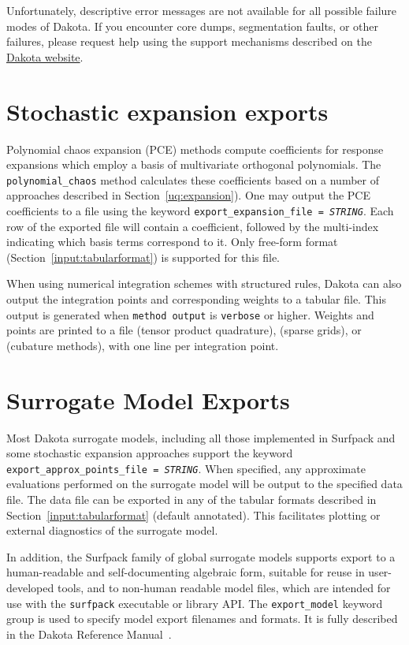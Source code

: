 Unfortunately, descriptive error messages are not available for all
possible failure modes of Dakota. If you encounter core dumps,
segmentation faults, or other failures, please request help using the
support mechanisms described on the
\href{http://dakota.sandia.gov/}{Dakota website}.


\section{Stochastic expansion exports}\label{sec:output:pce}

Polynomial chaos expansion (PCE) methods compute coefficients for
response expansions which employ a basis of multivariate orthogonal
polynomials.  The \texttt{polynomial\_chaos} method calculates these
coefficients based on a number of approaches described in
Section~\ref{uq:expansion}).  One may output the PCE coefficients to a
file using the keyword \texttt{export\_expansion\_file =
  \emph{STRING}}.  Each row of the exported file will contain a
coefficient, followed by the multi-index indicating which basis terms
correspond to it.  Only free-form format
(Section~\ref{input:tabularformat}) is supported for this file.

When using numerical integration schemes with structured rules, Dakota
can also output the integration points and corresponding weights to a
tabular file.  This output is generated when \texttt{method output} is
\texttt{verbose} or higher.  Weights and points are printed to a file
 (tensor product quadrature),
 (sparse grids), or
 (cubature methods), with one
line per integration point.

\section{Surrogate Model Exports}

Most Dakota surrogate models, including all those implemented in
Surfpack and some stochastic expansion approaches support the keyword
\texttt{export\_approx\_points\_file = \emph{STRING}}.  When specified, any
approximate evaluations performed on the surrogate model will be
output to the specified data file.  The data file can be exported in
any of the tabular formats described in
Section~\ref{input:tabularformat} (default annotated).  This
facilitates plotting or external diagnostics of the surrogate model.

In addition, the Surfpack family of global surrogate models supports
export to a human-readable and self-documenting algebraic form, suitable for 
reuse in user-developed tools, and to non-human readable model files, 
which are intended for use with the {\tt surfpack} executable or library API. 
The \texttt{export\_model} keyword group is used to specify model export filenames 
and formats. It is fully described in the Dakota Reference Manual~\cite{RefMan}.

